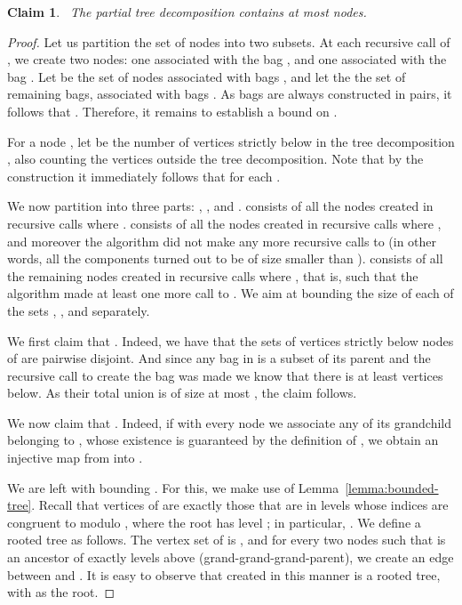 \documentclass[a4paper,11pt]{article}
\newtheorem{claim}[lemma]{Claim}
\theoremstyle{definition}
\theoremstyle{remark}
\begin{document}
\begin{claim}~\label{claim:sublinear-bags} The partial tree
  decomposition  contains at most  nodes.
\end{claim}
\begin{proof}
  Let us partition the set of nodes  into two subsets.  At
  each recursive call of , we create two nodes: one
  associated with the bag , and one associated with the bag
  .  Let  be the set of nodes associated with
  bags , and let  the the set of remaining bags,
  associated with bags .  As bags are always
  constructed in pairs, it follows that
  .  Therefore, it remains to
  establish a bound on .
  
  For a node , let  be the number of vertices
  strictly below  in the tree decomposition , also counting
  the vertices outside the tree decomposition.  Note that by the
  construction it immediately follows that  for each
  .
  
  We now partition  into three parts: ,
  , and .   consists of all
  the nodes created in recursive calls where .
   consists of all the nodes created in recursive
  calls where , and moreover the algorithm did not make
  any more recursive calls to  (in other words, all the
  components turned out to be of size smaller than ).
   consists of all the remaining nodes created in
  recursive calls where , that is, such that the algorithm
  made at least one more call to .  We aim at bounding the
  size of each of the sets , , and
   separately.
  
  We first claim that .  Indeed, we
  have that the sets of vertices strictly below nodes of
   are pairwise disjoint.
  And since any bag in  is a subset of its parent and the
  recursive call to create the bag was made we know that there is at least
   vertices below. As their total union is of size at most , the
  claim follows.
  
  We now claim that .  Indeed, if with
  every node  we associate any of its grandchild
  belonging to , whose existence is guaranteed by the
  definition of , we obtain an injective map from
   into .
  
  We are left with bounding .  For this, we make use of
  Lemma~\ref{lemma:bounded-tree}.  Recall that vertices of 
  are exactly those that are in levels whose indices are congruent to
   modulo , where the root has level ; in particular, .  We define a rooted tree  as follows.  The vertex set
  of  is , and for every two nodes 
  such that  is an ancestor of  exactly  levels above
  (grand-grand-grand-parent), we create an edge between  and .
  It is easy to observe that  created in this manner is a rooted
  tree, with  as the root.
  

\end{proof}
\end{document}
